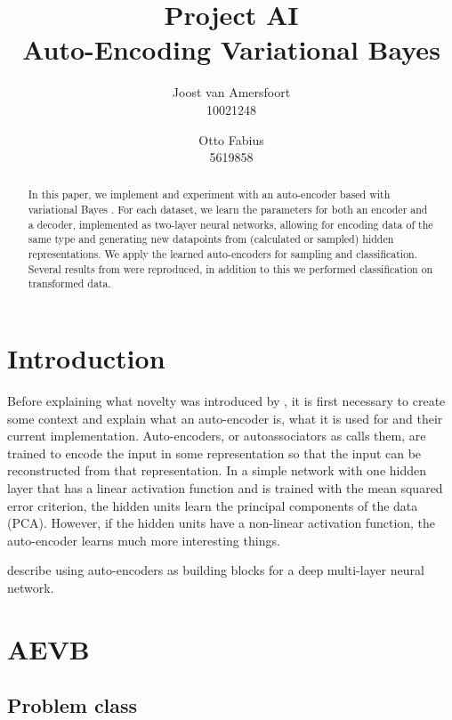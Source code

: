 \documentclass{article}
\begin{document}
\title{Project AI \\ Auto-Encoding Variational Bayes}
\author{	
	Joost van Amersfoort \\ 10021248  
	\and
	Otto Fabius \\ 5619858
	}
\maketitle

\begin{abstract}
In this paper, we implement and experiment with an auto-encoder based with variational Bayes \cite{kingma2013auto}. For each dataset, we learn the parameters for both an encoder and a decoder, implemented as two-layer neural networks, allowing for encoding data of the same type and generating new datapoints from (calculated or sampled) hidden representations. We apply the learned auto-encoders for sampling and classification. Several results from \cite{kingma2013auto} were reproduced, in addition to this we performed classification on transformed data.
\end{abstract}

\section{Introduction}

Before explaining what novelty was introduced by \cite{kingma2013auto}, it is first necessary to create some context and explain what an auto-encoder is, what it is used for and their current implementation. Auto-encoders, or autoassociators as \cite{bengio2009learning} calls them, are trained to encode the input in some representation so that the input can be reconstructed from that representation. In a simple network with one hidden layer that has a linear activation function and is trained with the mean squared error criterion, the hidden units learn the principal components of the data (PCA). However, if the hidden units have a non-linear activation function, the auto-encoder learns much more interesting things.

\cite{bengio2009learning} describe using auto-encoders as building blocks for a deep multi-layer neural network. 

\section{AEVB}

\subsection*{Problem class}
\end{document}
